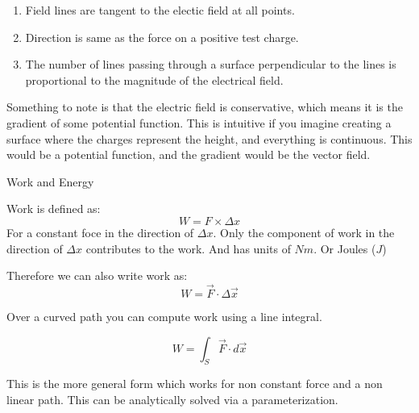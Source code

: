 \documentclass{report}
\begin{document}
\begin{description}
\begin{mdframed}
            \begin{enumerate}
                \item Field lines are tangent to the electic field
                    at all points.
                \item Direction is same as the force on a positive
                    test charge.
                \item The number of lines passing through a surface
                    perpendicular to the lines is proportional to
                    the magnitude of the electrical field.
            \end{enumerate}

            Something to note is that the electric field is
            conservative, which means it is the gradient of
            some potential function. This is intuitive if
            you imagine creating a surface where the
            charges represent the height, and everything
            is continuous. This would be a potential
            function, and the gradient would be the vector
            field.
        \end{mdframed}
        \pagebreak
    \item {\large Work and Energy}
        \begin{mdframed}
           Work is defined as: 
           \begin{displaymath}
                W = F \times \Delta x
           \end{displaymath}
           For a constant foce in the direction of
           $\Delta x$. Only the component
           of work in the direction of $\Delta x$
           contributes to the work.
           And has units of $\si{Nm}$. Or Joules ($\si{J}$)

           Therefore we can also write work as:
           \begin{displaymath}
                W = \vec{F} \cdot \Delta \vec{x}
           \end{displaymath}
           
           Over a curved path you can compute work using a
           line integral.

           \begin{displaymath}
               W = \int_S \vec{F} \cdot d\vec{x}
           \end{displaymath}

           This is the more general form which works for non
           constant force and a non linear path. This 
           can be analytically solved via a parameterization.


\end{mdframed}
\end{description}
\end{document}
